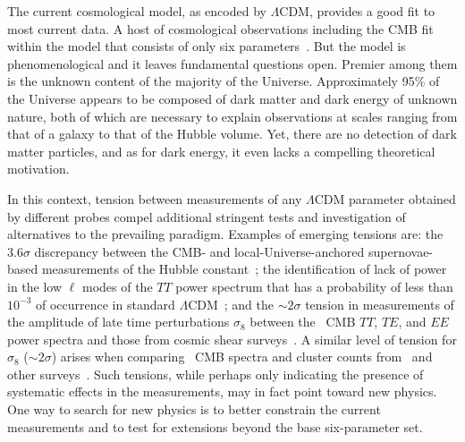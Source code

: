 \documentclass[PICOReport.tex]{subfiles}
\begin{document}

The current cosmological model, as encoded by $\Lambda$CDM, provides a good fit to most current data. A host of cosmological observations including the CMB fit within the model that consists of only six parameters~\citep{Planck2018_I}. But the model is phenomenological and it leaves fundamental questions open. Premier among them is the unknown content of the majority of the Universe. Approximately 95\% of the Universe appears to be composed of dark matter and dark energy of unknown nature, both of which are necessary to explain observations at scales ranging from that of a galaxy to that of the Hubble volume. Yet, there are no detection of dark matter particles, and as for dark energy, it even lacks a compelling theoretical motivation.

In this context, tension between measurements of any $\Lambda$CDM parameter obtained by different probes compel additional stringent tests and investigation of alternatives to the prevailing paradigm. Examples of emerging tensions are: the $3.6\sigma$ discrepancy between the CMB- and local-Universe-anchored supernovae-based measurements of the Hubble constant~\citep{Aghanim:2018eyx,Riess2018}; the identification of lack of power in the low $\ell$ modes of the $TT$ power spectrum that has a probability of less than $10^{-3}$ of occurrence in standard $\Lambda$CDM~\citep{TT_correlations}; and the $\sim 2\sigma$ tension in measurements of the amplitude of late time perturbations $\sigma_{8}$ between 
the \planck\ CMB $TT$, $TE$, and $EE$ power spectra and those from cosmic shear surveys~\citep{Joudaki+2017, Abbott+2018, Hikage+2018, vanUitert+2018}.  A similar level  of tension for $\sigma_{8}$ ($\sim2\sigma$) arises when comparing \planck\ CMB spectra and cluster counts from \planck\ and other surveys~\citep{Planck, Bocquet+2018}. Such tensions, while perhaps only indicating the presence of systematic effects in the measurements, may in fact point toward new physics. One way to search for new physics is to better constrain the current measurements and to test for extensions beyond the base six-parameter set. 
\end{document}
